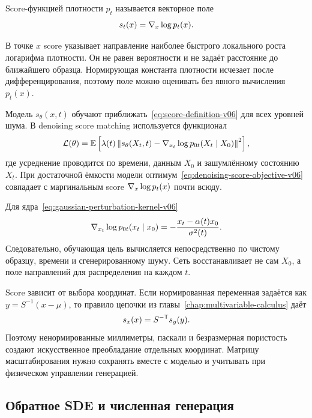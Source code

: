 \begin{definition}
Score-функцией плотности $p_t$ называется векторное поле
\begin{equation}\label{eq:score-definition-v06}
s_t(x) = \nabla_x\log p_t(x).
\end{equation}
\end{definition}
В точке $x$ score указывает направление наиболее быстрого локального роста логарифма плотности. Он не равен вероятности и не задаёт расстояние до ближайшего образца. Нормирующая константа плотности исчезает после дифференцирования, поэтому поле можно оценивать без явного вычисления $p_t(x)$.

Модель $s_\theta(x,t)$ обучают приближать~\eqref{eq:score-definition-v06} для всех уровней шума. В denoising score matching используется функционал
\begin{equation}\label{eq:denoising-score-objective-v06}
\mathcal L(\theta) = \mathbb E \left[ \lambda(t) \left\lVert s_\theta(X_t,t) - \nabla_{x_t}\log p_{0t}(X_t\mid X_0) \right\rVert^2 \right],
\end{equation}
где усреднение проводится по времени, данным $X_0$ и зашумлённому состоянию $X_t$. При достаточной ёмкости модели оптимум~\eqref{eq:denoising-score-objective-v06} совпадает с маргинальным score $\nabla_x\log p_t(x)$ почти всюду.

Для ядра~\eqref{eq:gaussian-perturbation-kernel-v06}
\begin{equation}\label{eq:gaussian-conditional-score-v06}
\nabla_{x_t}\log p_{0t}(x_t\mid x_0) = - \frac{x_t-\alpha(t)x_0}{\sigma^2(t)}.
\end{equation}
Следовательно, обучающая цель вычисляется непосредственно по чистому образцу, времени и сгенерированному шуму. Сеть восстанавливает не сам $X_0$, а поле направлений для распределения на каждом $t$.

Score зависит от выбора координат. Если нормированная переменная задаётся как $y=S^{-1}(x-\mu)$, то правило цепочки из главы~\ref{chap:multivariable-calculus} даёт
\begin{equation}\label{eq:score-rescaling-v06}
s_x(x) = S^{-\mathsf{T}}s_y(y).
\end{equation}
Поэтому ненормированные миллиметры, паскали и безразмерная пористость создают искусственное преобладание отдельных координат. Матрицу масштабирования нужно сохранять вместе с моделью и учитывать при физическом управлении генерацией.

\subsection{Обратное SDE и численная генерация}

